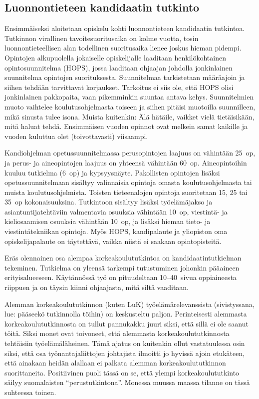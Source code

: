 \documentclass[a5paper, 8pt, twocolumn]{book} %
\numberwithin{equation}{section}
\begin{document}
\subsection*{Luonnontieteen kandidaatin tutkinto}
Ensimmäiseksi aloitetaan opiskelu kohti
luonnontieteen kandidaatin tutkintoa.
Tutkinnon virallinen tavoitesuoritusaika
on kolme vuotta, tosin luonnon\-tieteellisen alan
todellinen suoritus\-aika lienee joskus hieman pidempi.
Opintojen alkupuolella jokaiselle
opiskelijalle laaditaan henkilökohtainen
opintosuunnitelma (HOPS), jossa laaditaan
ohjaajan johdolla jonkinlainen suunnitelma
opintojen suorituksesta. Suunnitelmaa tarkistetaan
määräajoin ja siihen tehdään tarvittavat
korjaukset. Tarkoitus ei siis ole, että HOPS
olisi jonkinlainen pakkopaita, vaan pikemminkin
suuntaa antava kehys. Suunnitelmien
muoto vaihtelee koulutusohjelmasta toiseen
ja siihen pitäisi muotoilla suunnilleen,
mikä sinusta tulee isona. Muista kuitenkin:
Älä hätäile, vaikket vielä tietäisikään,
mitä haluat tehdä. Ensimmäisen vuoden opinnot
ovat melkein samat kaikille ja vuoden kuluttua
olet (toivottavasti) viisaampi.

Kandiohjelman opetussuunnitelmassa perusopintojen laajuus on vähintään 25~op, ja perus- ja aineopintojen laajuus on yhteensä vähintään 60~op. Aineopintoihin kuuluu tutkielma (6~op) ja kypsyysnäyte. Pakollisten
opintojen lisäksi opetussuunnitelmaan sisältyy valinnaisia opintoja omasta koulutusohjelmasta tai muista koulutusohjelmista. Toisten tieteenalojen opintoja suoritetaan 15, 25 tai 35~op kokonaisuuksina.
Tutkintoon sisältyy lisäksi työelämäjakso ja asiantuntijatehtäviin valmentavia osuuksia vähintään 10~op, viestintä- ja kieliosaamisen osuuksia vähintään 10~op, ja lisäksi hieman tieto- ja viestintätekniikan opintoja. Myös HOPS, kandipalaute ja yliopiston oma opiskelijapalaute on täytettävä, vaikka niistä ei saakaan opintopisteitä.

Eräs olennainen osa alempaa korkeakoulututkintoa
on kandidaatintutkielman tekeminen. Tutkielma on yleensä tarkempi
tutustuminen johonkin pääaineen erityisalueeseen. Käytännössä työ on pituudeltaan
10--40~sivua oppiaineesta riippuen ja on täysin kiinni ohjaajasta, mitä siltä vaaditaan.

Alemman korkea\-koulu\-tutkinnon (kuten LuK) työ\-elämä\-relevanssista
(sivistys\-sana, lue: pääseekö
tutkinnolla töihin) on keskusteltu
paljon. Perinteisesti alemmasta korkea\-koulu\-tutkinnosta
on tullut pannukakku juuri siksi, että sillä ei ole saanut
töitä. Siksi monet ovat toivoneet, että
alemmasta korkeakoulututkinnosta tehtäisiin
työelämäläheinen. Tämä ajatus on
kuitenkin ollut vastatuulessa osin siksi, että
osa työnantajaliittojen johtajista ilmoitti
jo hyvissä ajoin etukäteen, että ainakaan
heidän alallaan ei palkata alemman korkea\-koulu\-tutkinnon
suorittaneita. Positiivinen
puoli tässä on se, että ylempi korkea\-koulu\-tutkinto
säilyy suomalaisten ``perustutkintona''.
Monessa muussa maassa tilanne on
tässä suhteessa toinen.
\end{document}
